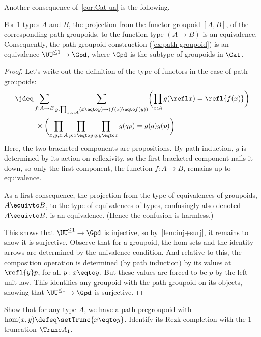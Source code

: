 Another consequence of~\cref{cor:Cat-ua} is the following.
\begin{theorem}\label{thm:1types-are-groupoids}
  For $1$-types $A$ and $B$,
  the projection from the functor groupoid
  $[A,B]$, of the corresponding path groupoids,
  to the function type $(A\to B)$ is an equivalence.
  Consequently, the path groupoid construction (\cref{ex:path-groupoid})
  is an equivalence $\UU^{\le1} \to \Gpd$,
  where $\Gpd$ is the subtype of groupoids in $\Cat$.
\end{theorem}
\begin{proof}
  Let's write out the definition of the type of functors
  in the case of path groupoids:
  \begin{align*}
    [A,B] \jdeq &\sum_{f : A \to B}
    \sum_{g : \prod_{x,y:A}(x\eqto y) \to (f(x) \eqto f(y))}
    \biggl(\prod_{x:A} g(\refl x) = \refl{f(x)}\biggr) \\
    &\;\times \biggl(\prod_{x,y,z:A}\prod_{p:x\eqto y}\prod_{q:y\eqto z}
    g(qp) = g(q)g(p)\biggr)
  \end{align*}
  Here, the two bracketed components are propositions.
  By path induction, $g$ is determined by its action on reflexivity,
  so the first bracketed component nails it down,
  so only the first component, the function $f:A\to B$,
  remains up to equivalence.

  As a first consequence, the projection from the type of
  equivalences of groupoids, $A \equivto B$,
  to the type of equivalences of types, confusingly also denoted
  $A \equivto B$, is an equivalence. (Hence the confusion is harmless.)

  This shows that $\UU^{\le 1} \to \Gpd$ is injective, so by~\cref{lem:inj+surj},
  it remains to show it is surjective. Observe that for a groupoid,
  the hom-sets and the identity arrows
  are determined by the univalence condition. And relative to this,
  the composition operation is determined (by path induction) by its
  values at $\refl{y}p$, for all $p:x\eqto y$.
  But these values are forced to be $p$ by the left unit law.
  This identifies any groupoid with the path groupoid on its objects,
  showing that $\UU^{\le 1} \to \Gpd$ is surjective.
\end{proof}
\begin{xca}\label{xca:Rezk-completion-1trunc}
  Show that for any type $A$, we have a path pregroupoid
  with $\hom(x,y) \defeq \setTrunc{x\eqto y}$.
  Identify its Rezk completion with the $1$-truncation $\Trunc A_1$.
\end{xca}

